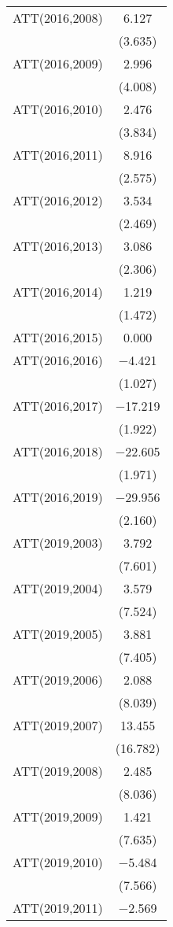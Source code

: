 \begin{table}
\begin{tabular}[t]{lc}
ATT(2016,2008) & \num{6.127}\\
 & (\num{3.635})\\
ATT(2016,2009) & \num{2.996}\\
 & (\num{4.008})\\
ATT(2016,2010) & \num{2.476}\\
 & (\num{3.834})\\
ATT(2016,2011) & \num{8.916}\\
 & (\num{2.575})\\
ATT(2016,2012) & \num{3.534}\\
 & (\num{2.469})\\
ATT(2016,2013) & \num{3.086}\\
 & (\num{2.306})\\
ATT(2016,2014) & \num{1.219}\\
 & (\num{1.472})\\
ATT(2016,2015) & \num{0.000}\\
ATT(2016,2016) & \num{-4.421}\\
 & (\num{1.027})\\
ATT(2016,2017) & \num{-17.219}\\
 & (\num{1.922})\\
ATT(2016,2018) & \num{-22.605}\\
 & (\num{1.971})\\
ATT(2016,2019) & \num{-29.956}\\
 & (\num{2.160})\\
ATT(2019,2003) & \num{3.792}\\
 & (\num{7.601})\\
ATT(2019,2004) & \num{3.579}\\
 & (\num{7.524})\\
ATT(2019,2005) & \num{3.881}\\
 & (\num{7.405})\\
ATT(2019,2006) & \num{2.088}\\
 & (\num{8.039})\\
ATT(2019,2007) & \num{13.455}\\
 & (\num{16.782})\\
ATT(2019,2008) & \num{2.485}\\
 & (\num{8.036})\\
ATT(2019,2009) & \num{1.421}\\
 & (\num{7.635})\\
ATT(2019,2010) & \num{-5.484}\\
 & (\num{7.566})\\
ATT(2019,2011) & \num{-2.569}\\

\end{tabular}
\end{table}
